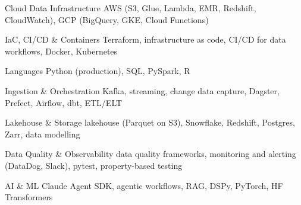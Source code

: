 
\begin{cvskills}

  \cvskill
    {Cloud Data Infrastructure}
    {AWS (S3, Glue, Lambda, EMR, Redshift, CloudWatch), GCP (BigQuery, GKE, Cloud Functions)}

  \cvskill
    {IaC, CI/CD \& Containers}
    {Terraform, infrastructure as code, CI/CD for data workflows, Docker, Kubernetes}

  \cvskill
    {Languages}
    {Python (production), SQL, PySpark, R}

  \cvskill
    {Ingestion \& Orchestration}
    {Kafka, streaming, change data capture, Dagster, Prefect, Airflow, dbt, ETL/ELT}

  \cvskill
    {Lakehouse \& Storage}
    {lakehouse (Parquet on S3), Snowflake, Redshift, Postgres, Zarr, data modelling}

  \cvskill
    {Data Quality \& Observability}
    {data quality frameworks, monitoring and alerting (DataDog, Slack), pytest, property-based testing}

  \cvskill
    {AI \& ML}
    {Claude Agent SDK, agentic workflows, RAG, DSPy, PyTorch, HF Transformers}

\end{cvskills}
